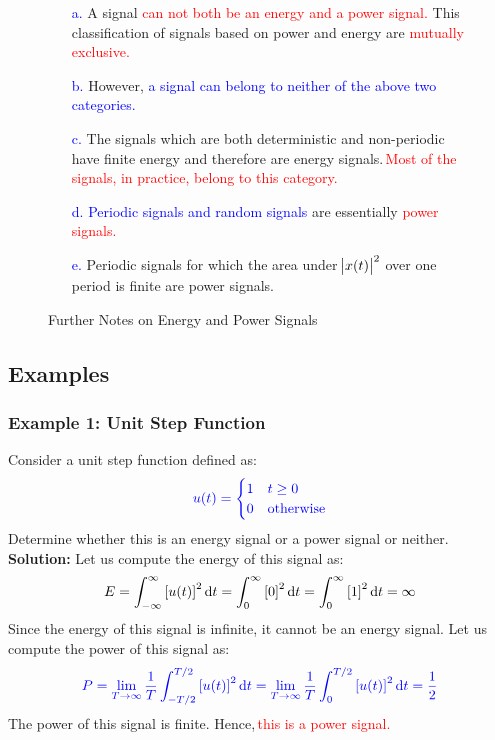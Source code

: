 \documentclass[../notes-main.tex]{subfiles}
\begin{document}
\vspace{-1em}
\begin{figure}[H]
    \centering
    \begin{mdframed}
        \begin{center}
            \begin{itemize}
                \item[\textcolor{blue}{a.}] A signal \textcolor{red}{can not both be an energy and a power signal.} This classification of signals based on power and energy are \textcolor{red}{mutually exclusive.}
                \item[\textcolor{blue}{b.}] However, \textcolor{blue}{a signal can belong to neither of the above two categories.}
                \item[\textcolor{blue}{c.}] The signals which are both deterministic and non-periodic have finite energy and therefore are energy signals.\,\textcolor{red}{Most of the signals, in practice, belong to this category.}
                \item[\textcolor{blue}{d.}] \textcolor{blue}{Periodic signals and random signals} are essentially \textcolor{red}{power signals.}
                \item[\textcolor{blue}{e.}] Periodic signals for which the area under \(\abs{x(t)}^2\) over one period is finite are power signals.
            \end{itemize}
        \end{center}
    \end{mdframed}\label{fig:energy-power-relationship-2}
    \vspace{-1em}\caption{Further Notes on Energy and Power Signals}
\end{figure}
\vspace{-1em}
\subsection{Examples}
\subsubsection{Example 1: Unit Step Function}
Consider a unit step function defined as:
\[
    \textcolor{blue}{u(t) =
        \begin{cases}
            1 & t \geq 0         \\
            0 & \text{otherwise}
        \end{cases}}
\]
Determine whether this is an energy signal or a power signal or neither.\\
\noindent \textbf{Solution:} Let us compute the energy of this signal as:
\[
    E = \int_{-\infty}^{\infty} {[u(t)]}^2 \dif t = \int_{0}^{\infty} {[0]}^2 \dif t = \int_{0}^{\infty} {[1]}^2 \dif t = \infty
\]
Since the energy of this signal is infinite, it cannot be an energy signal. Let us compute the power of this signal as:
\[
    \textcolor{blue}{P = \lim_{T \to \infty} \frac{1}{T} \int_{-T/2}^{T/2} {[u(t)]}^2 \dif t = \lim_{T \to \infty} \frac{1}{T} \int_{0}^{T/2} {[u(t)]}^2 \dif t = \frac{1}{2}}
\]
The power of this signal is finite. Hence,\,\textcolor{red}{this is a power signal.}
\end{document}
